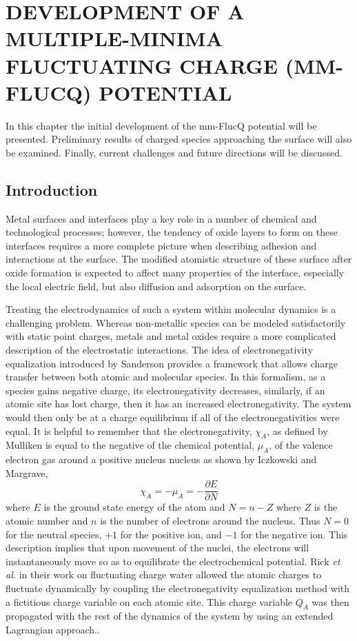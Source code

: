 
\chapter{DEVELOPMENT OF A MULTIPLE-MINIMA FLUCTUATING CHARGE (MM-FLUCQ) POTENTIAL}
\label{chap:mmFlucQ}


In this chapter the initial development of the mm-FlucQ potential will be
presented. Preliminary results of charged species approaching the 
surface will also be examined. Finally, current challenges and future
directions will be discussed.


\section{Introduction}
Metal surfaces and interfaces play a key role in a number of chemical and
technological processes; however, the tendency of oxide layers to form on these
interfaces requires a more complete picture when describing adhesion and
interactions at the surface. The modified atomistic structure of these surface
after oxide formation is expected to affect many properties of the interface,
especially the local electric field, but also diffusion and adsorption on the
surface.\citep{Bray:2011hq,Small:2012dw,Streitz:1994mw}

Treating the electrodynamics of such a system within molecular dynamics is a
challenging problem. Whereas non-metallic species can be modeled satisfactorily
with static point charges, metals and metal oxides require a more complicated
description of the electrostatic interactions. The idea of electronegativity
equalization introduced by Sanderson\citep{Sanderson:1951mz} provides a
framework that allows charge transfer between both atomic and molecular
species. In this formalism, as a species gains negative charge, its electronegativity
decreases, similarly, if an atomic site has lost charge, then it has an
increased electronegativity. The system would then only be at a charge
equilibrium if all of the electronegativities were equal. It is helpful to
remember that the electronegativity, $\chi_A$, as defined by
Mulliken\citep{Mulliken:1934wt} is equal to the negative of the chemical
potential, $\mu_A$, of the valence electron gas around a positive nucleus
nucleus as shown by Iczkowski and Margrave\citep{Iczkowski:1961wq},
\begin{equation}
\chi_A = -\mu_A = -\frac{\partial E}{\partial N}
\end{equation}
where $E$ is the ground state energy of the atom and $N = n - Z$ where $Z$ is
the atomic number and $n$ is the number of electrons around the nucleus. Thus
$N = 0$ for the neutral species, $+1$ for the positive ion, and $-1$ for the
negative ion.  This description implies that upon movement of the nuclei, the
electrons will instantaneously move so as to equilibrate the electrochemical
potential. Rick {\it et al.} in their work on fluctuating charge water
allowed the atomic charges to fluctuate dynamically by coupling the
electronegativity equalization method with a fictitious charge variable on each
atomic site. This charge variable $Q_A$ was then propagated with the rest of
the dynamics of the system by using an extended Lagrangian
approach.\citep{Rick:1994ss}.

